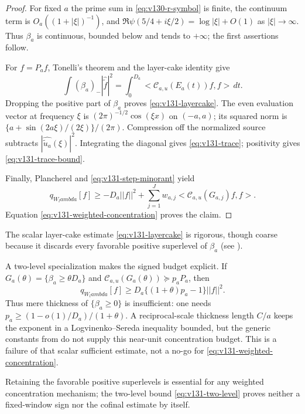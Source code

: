 \documentclass[11pt]{article}
\def\lambda{lambda}%
\def\norm#1{||#1||}%
\def\ip#1#2{<#1,#2>}%
\theoremstyle{remark}
\newcommand{\norm}[1]{\left\lVert #1\right\rVert}
\newcommand{\ip}[2]{\left\langle #1,#2\right\rangle}
\begin{document}
\begin{proof}
For fixed $a$ the prime sum in \eqref{eq:v130-r-symbol} is finite, the
continuum term is $O_a((1+|\xi|)^{-1})$, and
$\Re\psi(5/4+i\xi/2)=\log|\xi|+O(1)$ as $|\xi|\to\infty$.
Thus $\beta_a$ is continuous, bounded below and tends to $+\infty$;
the first assertions follow.

For $f=P_af$, Tonelli's theorem and the layer-cake identity give
\[
 \int(\beta_a)_-|\widehat{\widetilde f}|^2
 =\int_0^{D_a}\ip{\mathcal C_{a,u}(E_a(t))f}f\,dt.
\]
Dropping the positive part of $\beta_a$ proves
\eqref{eq:v131-layercake}.  The even evaluation vector at frequency
$\xi$ is $(2\pi)^{-1/2}\cos(\xi x)$ on $(-a,a)$; its squared norm is
$\{a+\sin(2a\xi)/(2\xi)\}/(2\pi)$.  Compression off the normalized
source subtracts $|\widehat{\widetilde u_a}(\xi)|^2$.  Integrating the
diagonal gives \eqref{eq:v131-trace}; positivity gives
\eqref{eq:v131-trace-bound}.

Finally, Plancherel and \eqref{eq:v131-step-minorant} yield
\[
 q_{W_\lambda}[f]
 \ge -D_a\norm f^2+
       \sum_{j=1}^Jw_{a,j}\ip{\mathcal C_{a,u}(G_{a,j})f}f.
\]
Equation \eqref{eq:v131-weighted-concentration} proves the claim.
\end{proof}

The scalar layer-cake estimate \eqref{eq:v131-layercake} is rigorous, though coarse because it discards every favorable positive superlevel of $\beta_a$ (see ).

A two-level specialization makes the signed budget explicit.  If
$G_a(\theta)=\{\beta_a\ge\theta D_a\}$ and
$\mathcal C_{a,u}(G_a(\theta))\succeq p_aP_a$, then
\begin{equation}\label{eq:v131-two-level}
 q_{W_\lambda}[f]
 \ge D_a\{(1+\theta)p_a-1\}\norm f^2.
\end{equation}
Thus mere thickness of $\{\beta_a\ge0\}$ is insufficient: one needs
$p_a\ge(1-o(1)/D_a)/(1+\theta)$.  A reciprocal-scale thickness
length $C/a$ keeps the exponent in a Logvinenko--Sereda inequality
bounded, but the generic constants from
\cite{Kovrijkine2000} do not supply this near-unit concentration
budget.  This is a failure of that scalar sufficient estimate, not a
no-go for \eqref{eq:v131-weighted-concentration}.

Retaining the favorable positive superlevels is essential for any weighted concentration mechanism; the two-level bound \eqref{eq:v131-two-level} proves neither a fixed-window sign nor the cofinal estimate by itself.
\end{document}
